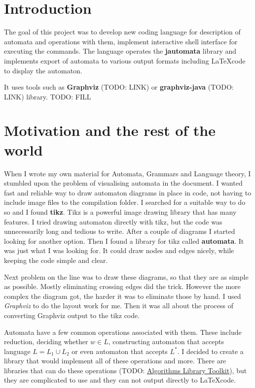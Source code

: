 \documentclass{ctuthesis}
\begin{document}
\maketitle

\chapter{Introduction}
The goal of this project was to develop new coding language for description of automata and operations with them, implement interactive shell interface for executing the commands. The language operates the \textbf{jautomata} library and implements export of automata to various output formats including \LaTeX code to display the automaton. 

It uses tools such as \textbf{Graphviz} (TODO: LINK) or \textbf{graphviz-java} (TODO: LINK) library. 
TODO: FILL


\chapter{Motivation and the rest of the world}
When I wrote my own material for Automata, Grammars and Language theory, I stumbled upon the problem of visualising automata in the document. I wanted fast and reliable way to draw automaton diagrams in place in code, not having to include image files to the compilation folder. I searched for a suitable way to do so and I found \textbf{tikz}. Tikz is a powerful image drawing library that has many features. I tried drawing automaton directly with tikz, but the code was unnecessarily long and tedious to write. After a couple of diagrams I started looking for another option. Then I found a library for tikz called \textbf{automata}. It was just what I was looking for. It could draw nodes and edges nicely, while keeping the code simple and clear. 

Next problem on the line was to draw these diagrams, so that they are as simple as possible. Mostly eliminating crossing edges did the trick. However the more complex the diagram got, the harder it was to eliminate those by hand. I used \textit{Graphviz} to do the layout work for me. Then it was all about the process of converting Graphviz output to the tikz code.

Automata have a few common operations associated with them. These include reduction, deciding whether $w \in L$, constructing automaton that accepts language $L = L_1 \cup L_2$ or even automaton that accepts $L^*$. I decided to create a library that would implement all of these operations and more. There are libraries that can do these operations (TODO: \href{https://gitlab.fit.cvut.cz/algorithms-library-toolkit/automata-library/}{Algorithms Library Toolkit}), but they are complicated to use and they can not output directly to \LaTeX code. 
\end{document}
